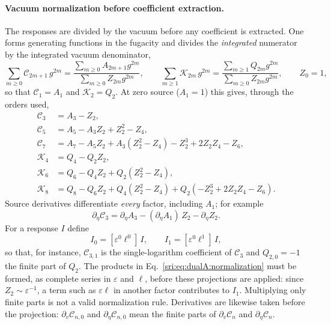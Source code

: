 \paragraph{Vacuum normalization before coefficient extraction.} The responses are divided by the vacuum before any
coefficient is extracted. One forms generating functions in the fugacity and divides the \emph{integrated} numerator
by the integrated vacuum denominator,
\begin{equation}
 \sum_{m\ge0}\mathcal C_{2m+1}\,g^{2m}=\frac{\sum_{m\ge0}A_{2m+1}g^{2m}}{\sum_{m\ge0}Z_{2m}g^{2m}},\qquad
 \sum_{m\ge1}\mathcal K_{2m}\,g^{2m}=\frac{\sum_{m\ge1}Q_{2m}g^{2m}}{\sum_{m\ge0}Z_{2m}g^{2m}},\qquad Z_0=1,
 \label{sri:eq:dualA:genfun}
\end{equation}
so that $\mathcal C_1=A_1$ and $\mathcal K_2=Q_2$. At zero source ($A_1=1$) this gives, through the orders used,
\begin{equation}
\begin{aligned}
 \mathcal C_3&=A_3-Z_2,\\
 \mathcal C_5&=A_5-A_3Z_2+Z_2^2-Z_4,\\
 \mathcal C_7&=A_7-A_5Z_2+A_3(Z_2^2-Z_4)-Z_2^3+2Z_2Z_4-Z_6,\\
 \mathcal K_4&=Q_4-Q_2Z_2,\\
 \mathcal K_6&=Q_6-Q_4Z_2+Q_2(Z_2^2-Z_4),\\
 \mathcal K_8&=Q_8-Q_6Z_2+Q_4(Z_2^2-Z_4)+Q_2(-Z_2^3+2Z_2Z_4-Z_6).
\end{aligned}
\label{sri:eq:dualA:normalization}
\end{equation}
Source derivatives differentiate \emph{every} factor, including $A_1$; for example
\begin{equation}
 \partial_\eta\mathcal C_3=\partial_\eta A_3-(\partial_\eta A_1)\,Z_2-\partial_\eta Z_2.
\end{equation}
For a response $I$ define
\begin{equation}
 I_0=[\varepsilon^0\ell^0]\,I,\qquad I_1=[\varepsilon^0\ell^1]\,I,
 \label{sri:eq:dualA:I0I1}
\end{equation}
so that, for instance, $\mathcal C_{3,1}$ is the single-logarithm coefficient of $\mathcal C_3$ and $Q_{2,0}=-1$ the
finite part of $Q_2$. The products in Eq.~\eqref{sri:eq:dualA:normalization} must be formed, as complete series in
$\varepsilon$ and $\ell$, before these projections are applied: since $Z_2\sim\varepsilon^{-1}$, a term such as
$\varepsilon\ell$ in another factor contributes to $I_1$. Multiplying only finite parts is not a valid normalization
rule. Derivatives are likewise taken before the projection: $\partial_v\mathcal C_{n,0}$ and $\partial_\eta\mathcal
C_{n,0}$ mean the finite parts of $\partial_v\mathcal C_n$ and $\partial_\eta\mathcal C_n$.

